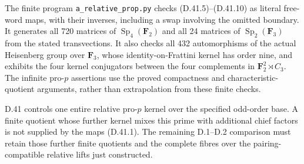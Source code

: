 The finite program
\texttt{a\_relative\_prop.py}
checks \textup{(D.41.5)--(D.41.10)}
as literal free-word maps, with
their inverses, including a swap
involving the omitted boundary.
It generates all 720 matrices
of \(\operatorname{Sp}_4(\mathbf F_2)\)
and all 24 matrices of
\(\operatorname{Sp}_2(\mathbf F_3)\)
from the stated transvections.
It also checks all 432
automorphisms of the actual
Heisenberg group over \(\mathbf F_3\),
whose identity-on-Frattini kernel
has order nine, and exhibits the
four kernel conjugators between
the four complements in
\(\mathbf F_2^2\rtimes C_3\).
The infinite pro-\(p\) assertions
use the proved compactness and
characteristic-quotient arguments,
rather than extrapolation from
these finite checks.

D.41 controls one entire relative
pro-\(p\) kernel over the specified
odd-order base.  A finite quotient
whose further kernel mixes this
prime with additional chief factors
is not supplied by the maps
\textup{(D.41.1)}.
The remaining D.1--D.2 comparison
must retain those further finite
quotients and the complete fibres
over the pairing-compatible
relative lifts just constructed.
